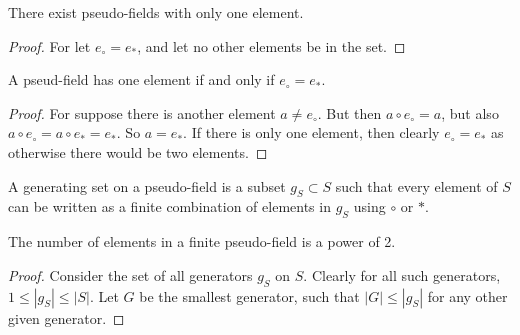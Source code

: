             \begin{theorem}
            There exist pseudo-fields with only one element.
            \end{theorem}
            \begin{proof}
            For let $e_{\circ} = e_{*}$, and let no other elements be in the set. 
            \end{proof}
            \begin{theorem}
            A pseud-field has one element if and only if $e_{\circ} = e_{*}$.
            \end{theorem}
            \begin{proof}
            For suppose there is another element $a \ne e_{\circ}$. But then $a \circ e_{\circ} = a$, but also $a \circ e_{\circ} = a \circ e_{*} = e_{*}$. So $a = e_{*}$. If there is only one element, then clearly $e_{\circ} = e_{*}$ as otherwise there would be two elements.
            \end{proof}
            \begin{definition} A generating set on a pseudo-field is a subset $g_S \subset S$ such that every element of $S$ can be written as a finite combination of elements in $g_S$ using $\circ$ or $*$.
            \end{definition}
            \begin{theorem}
            The number of elements in a finite pseudo-field is a power of 2.
            \end{theorem}
            \begin{proof}
            Consider the set of all generators $g_S$ on $S$. Clearly for all such generators, $1\leq |g_S|\leq |S|$. Let $G$ be the smallest generator, such that $|G| \leq |g_S|$ for any other given generator. 
            \end{proof}